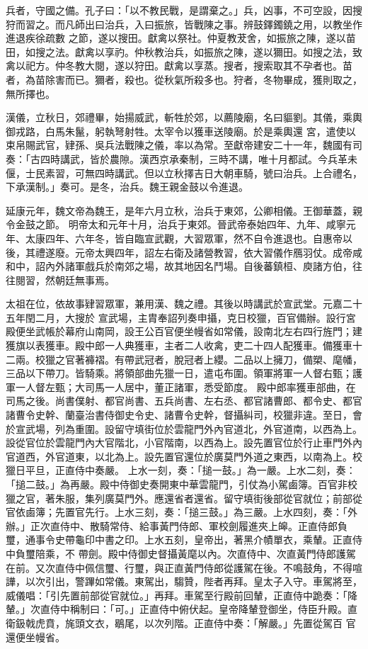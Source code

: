 \begin{pinyinscope}
 兵者，守國之備。孔子曰：「以不教民戰，是謂棄之。」兵，凶事，不可空設，因搜狩而習之。而凡師出曰治兵，入曰振旅，皆戰陳之事。辨鼓鐸鐲鐃之用，以教坐作進退疾徐疏數
 之節，遂以搜田。獻禽以祭社。仲夏教茇舍，如振旅之陳，遂以苗田，如搜之法。獻禽以享礿。仲秋教治兵，如振旅之陳，遂以獮田。如搜之法，致禽以祀方。仲冬教大閱，遂以狩田。獻禽以享蒸。搜者，搜索取其不孕者也。苗者，為苗除害而已。獮者，殺也。從秋氣所殺多也。狩者，冬物畢成，獲則取之，無所擇也。



 漢儀，立秋日，郊禮畢，始揚威武，斬牲於郊，以薦陵廟，名曰貙劉。其儀，乘輿御戎路，白馬朱鬣，躬執弩射牲。太宰令以獲車送陵廟。於是乘輿還
 宮，遣使以束帛賜武官，肄孫、吳兵法戰陳之儀，率以為常。至獻帝建安二十一年，魏國有司奏：「古四時講武，皆於農隙。漢西京承秦制，三時不講，唯十月都試。今兵革未偃，士民素習，可無四時講武。但以立秋擇吉日大朝車騎，號曰治兵。上合禮名，下承漢制。」奏可。是冬，治兵。魏王親金鼓以令進退。



 延康元年，魏文帝為魏王，是年六月立秋，治兵于東郊，公卿相儀。王御華蓋，親令金鼓之節。
 明帝太和元年十月，治兵于東郊。晉武帝泰始四年、九年、咸寧元年、太康四年、六年冬，皆自臨宣武觀，大習眾軍，然不自令進退也。自惠帝以後，其禮遂廢。元帝太興四年，詔左右衛及諸營教習，依大習儀作鴈羽仗。成帝咸和中，詔內外諸軍戲兵於南郊之場，故其地因名鬥場。自後蕃鎮桓、庾諸方伯，往往閱習，然朝廷無事焉。



 太祖在位，依故事肄習眾軍，兼用漢、魏之禮。其後以時講武於宣武堂。元嘉二十五年閏二月，大搜於
 宣武場，主胄奉詔列奏申攝，克日校獵，百官備辦。設行宮殿便坐武帳於幕府山南岡，設王公百官便坐幔省如常儀，設南北左右四行旌門；建獲旗以表獲車。殿中郎一人典獲車，主者二人收禽，吏二十四人配獲車。備獲車十二兩。校獵之官著褲褶。有帶武冠者，脫冠者上纓。二品以上擁刀，備槊、麾幡，三品以下帶刀。皆騎乘。將領部曲先獵一日，遣屯布圍。領軍將軍一人督右甄；護軍一人督左甄；大司馬一人居中，董正諸軍，悉受節度。
 殿中郎率獲車部曲，在司馬之後。尚書僕射、都官尚書、五兵尚書、左右丞、都官諸曹郎、都令史、都官諸曹令史幹、蘭臺治書侍御史令史、諸曹令史幹，督攝糾司，校獵非違。至日，會於宣武場，列為重圍。設留守填街位於雲龍門外內官道北，外官道南，以西為上。設從官位於雲龍門內大官階北，小官階南，以西為上。設先置官位於行止車門外內官道西，外官道東，以北為上。設先置官還位於廣莫門外道之東西，以南為上。校獵日平旦，正直侍中奏嚴。
 上水一刻，奏：「搥一鼓。」為一嚴。上水二刻，奏：「搥二鼓。」為再嚴。殿中侍御史奏開東中華雲龍門，引仗為小駕鹵簿。百官非校獵之官，著朱服，集列廣莫門外。應還省者還省。留守填街後部從官就位；前部從官依鹵簿；先置官先行。上水三刻，奏：「搥三鼓。」為三嚴。上水四刻，奏：「外辦。」正次直侍中、散騎常侍、給事黃門侍郎、軍校劍履進夾上皞。正直侍郎負璽，通事令史帶龜印中書之印。上水五刻，皇帝出，著黑介幘單衣，乘輦。正直侍中負璽陪乘，不
 帶劍。殿中侍御史督攝黃麾以內。次直侍中、次直黃門侍郎護駕在前。又次直侍中佩信璽、行璽，與正直黃門侍郎從護駕在後。不鳴鼓角，不得喧譁，以次引出，警蹕如常儀。東駕出，騶贊，陛者再拜。皇太子入守。車駕將至，威儀唱：「引先置前部從官就位。」再拜。車駕至行殿前回輦，正直侍中跪奏：「降輦。」次直侍中稱制曰：「可。」正直侍中俯伏起。皇帝降輦登御坐，侍臣升殿。直衛鈒戟虎賁，旄頭文衣，鶡尾，以次列階。正直侍中奏：「解嚴。」先置從駕百
 官還便坐幔省。




\end{pinyinscope}
